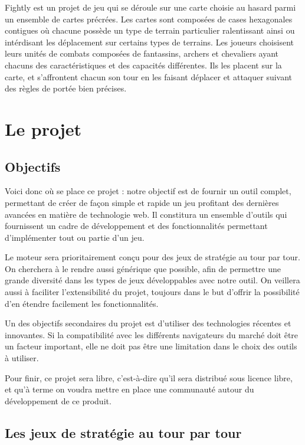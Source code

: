 \documentclass[a4paper,10pt]{report}
\begin{document}
    Fightly est un projet de jeu qui se déroule sur une carte choisie au hasard parmi un ensemble de cartes précrées. Les cartes sont composées de cases hexagonales contigues où chacune possède un type de terrain particulier ralentissant ainsi ou intérdisant les déplacement sur certains types de terrains. Les joueurs choisisent leurs unités de combats composées de fantassins, archers et chevaliers ayant chacuns des caractéristiques et des capacités différentes. Ils les placent sur la carte, et s'affrontent chacun son tour en les faisant déplacer et attaquer suivant des règles de portée bien précises.



\chapter{Le projet}

  \section{Objectifs}

    Voici donc où se place ce projet : notre objectif est de fournir un outil complet, permettant de créer de façon simple et rapide un jeu profitant des dernières avancées en matière de technologie web. Il constitura un ensemble d'outils qui fournissent un cadre de développement et des fonctionnalités permettant d'implémenter tout ou partie d'un jeu.

    Le moteur sera prioritairement conçu pour des jeux de stratégie au tour par tour. On cherchera à le rendre aussi générique que possible, afin de permettre une grande diversité dans les types de jeux développables avec notre outil. On veillera aussi à faciliter l'extensibilité du projet, toujours dans le but d'offrir la possibilité d'en étendre facilement les fonctionnalités.

    Un des objectifs secondaires du projet est d'utiliser des technologies récentes et innovantes. Si la compatibilité avec les différents navigateurs du marché doit être un facteur important, elle ne doit pas être une limitation dans le choix des outils à utiliser. 

    Pour finir, ce projet sera libre, c'est-à-dire qu'il sera distribué sous licence libre, et qu'à terme on voudra mettre en place une communauté autour du développement de ce produit. 

  \section{Les jeux de stratégie au tour par tour}
\end{document}
